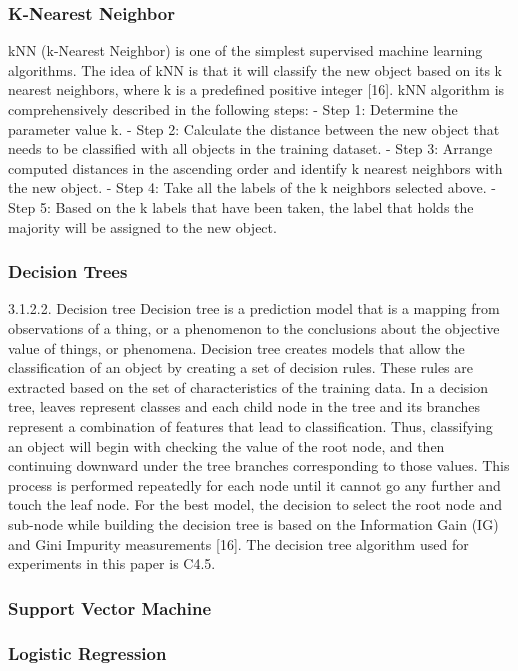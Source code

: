 \subsubsection{K-Nearest Neighbor}
kNN (k-Nearest Neighbor) is one of the simplest supervised machine learning algorithms.
The idea of kNN is that it will classify the new object based on its k nearest neighbors, where k is a
predefined positive integer [16]. kNN algorithm is comprehensively described in the following steps:
- Step 1: Determine the parameter value k.
- Step 2: Calculate the distance between the new object that needs to be classified with all objects
in the training dataset.
- Step 3: Arrange computed distances in the ascending order and identify k nearest neighbors with
the new object.
- Step 4: Take all the labels of the k neighbors selected above.
- Step 5: Based on the k labels that have been taken, the label that holds the majority will be
assigned to the new object.

\subsubsection{Decision Trees}
3.1.2.2. Decision tree
Decision tree is a prediction model that is a mapping from observations of a thing, or a
phenomenon to the conclusions about the objective value of things, or phenomena. Decision tree
creates models that allow the classification of an object by creating a set of decision rules. These rules
are extracted based on the set of characteristics of the training data. In a decision tree, leaves represent
classes and each child node in the tree and its branches represent a combination of features that
lead to classification. Thus, classifying an object will begin with checking the value of the root node,
and then continuing downward under the tree branches corresponding to those values. This process is
performed repeatedly for each node until it cannot go any further and touch the leaf node. For the best
model, the decision to select the root node and sub-node while building the decision tree is based on
the Information Gain (IG) and Gini Impurity measurements [16]. The decision tree algorithm used for
experiments in this paper is C4.5.

\subsubsection{Support Vector Machine}
\subsubsection{Logistic Regression}
